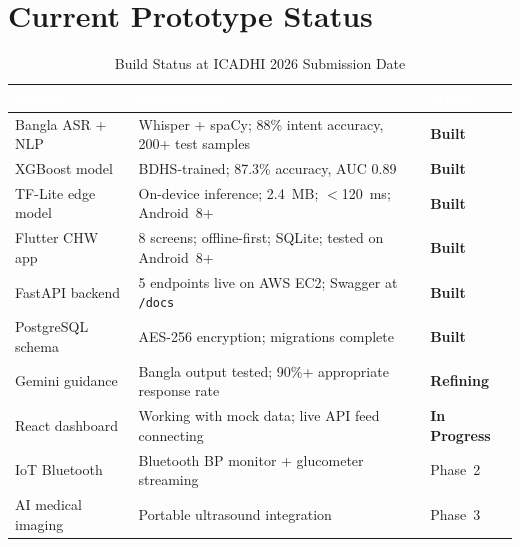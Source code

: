 \documentclass[12pt, a4paper]{article}
\newcommand{\code}[1]{\texttt{\small#1}}
\begin{document}
\section{Current Prototype Status}

\begin{table}[H]
\centering
\caption{Build Status at ICADHI 2026 Submission Date}
\small
\begin{tabularx}{\linewidth}{@{}lXl@{}}
\toprule
\rowcolor{navycolor}
\textcolor{white}{\textbf{Module}} &
\textcolor{white}{\textbf{Description}} &
\textcolor{white}{\textbf{Status}} \\
\midrule
Bangla ASR + NLP   & Whisper + spaCy; 88\% intent accuracy, 200+ test samples   & \textcolor{codegreen}{\textbf{Built}} \\
\rowcolor{gray10}
XGBoost model      & BDHS-trained; 87.3\% accuracy, AUC 0.89                    & \textcolor{codegreen}{\textbf{Built}} \\
TF-Lite edge model & On-device inference; 2.4~MB; $<$120~ms; Android~8+         & \textcolor{codegreen}{\textbf{Built}} \\
\rowcolor{gray10}
Flutter CHW app    & 8 screens; offline-first; SQLite; tested on Android~8+     & \textcolor{codegreen}{\textbf{Built}} \\
FastAPI backend    & 5 endpoints live on AWS EC2; Swagger at \code{/docs}        & \textcolor{codegreen}{\textbf{Built}} \\
\rowcolor{gray10}
PostgreSQL schema  & AES-256 encryption; migrations complete                     & \textcolor{codegreen}{\textbf{Built}} \\
Gemini guidance    & Bangla output tested; 90\%+ appropriate response rate       & \textcolor{riskamber}{\textbf{Refining}} \\
\rowcolor{gray10}
React dashboard    & Working with mock data; live API feed connecting            & \textcolor{riskamber}{\textbf{In Progress}} \\
IoT Bluetooth      & Bluetooth BP monitor + glucometer streaming                 & Phase~2 \\
\rowcolor{gray10}
AI medical imaging & Portable ultrasound integration                             & Phase~3 \\
\bottomrule
\end{tabularx}
\end{table}
\end{document}
